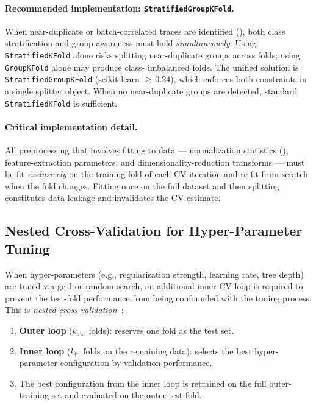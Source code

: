 \paragraph{Recommended implementation: \texttt{StratifiedGroupKFold}.}
When near-duplicate or batch-correlated traces are identified
(), both class stratification and group
awareness must hold \emph{simultaneously}.  Using
\texttt{StratifiedKFold} alone risks splitting near-duplicate groups
across folds; using \texttt{GroupKFold} alone may produce class-
imbalanced folds.  The unified solution is
\texttt{StratifiedGroupKFold} (scikit-learn $\geq$\,0.24), which
enforces both constraints in a single splitter object.  When no
near-duplicate groups are detected, standard \texttt{StratifiedKFold}
is sufficient.

\paragraph{Critical implementation detail.}
All preprocessing that involves fitting to data --- normalization
statistics (), feature-extraction parameters, and
dimensionality-reduction transforms --- must be fit \emph{exclusively} on
the training fold of each CV iteration and re-fit from scratch when the
fold changes.  Fitting once on the full dataset and then splitting
constitutes data leakage and invalidates the CV estimate.

\subsection{Nested Cross-Validation for Hyper-Parameter Tuning}
\label{sec:overfit:nested}

When hyper-parameters (e.g., regularisation strength, learning rate,
tree depth) are tuned via grid or random search, an additional inner CV
loop is required to prevent the test-fold performance from being
confounded with the tuning process.  This is \emph{nested
cross-validation}~\cite{varma2006nested_cv,cawley2010overfitting}:

\begin{enumerate}
  \item \textbf{Outer loop} ($k_{\text{out}}$ folds): reserves one fold
        as the test set.
  \item \textbf{Inner loop} ($k_{\text{in}}$ folds on the remaining
        data): selects the best hyper-parameter configuration by
        validation performance.
  \item The best configuration from the inner loop is retrained on the
        full outer-training set and evaluated on the outer test fold.
\end{enumerate}

